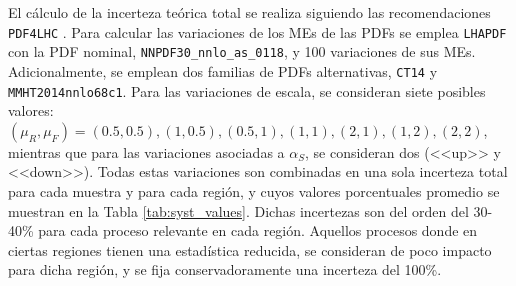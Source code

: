 \begin{sloppypar} %
El cálculo de la incerteza teórica total se realiza siguiendo las recomendaciones \texttt{PDF4LHC} \cite{Butterworth:2015oua}.
Para calcular las variaciones de los MEs de las PDFs se emplea \texttt{LHAPDF} \cite{lhapdf} con la PDF nominal, \texttt{NNPDF30\_nnlo\_as\_0118}, y 100 variaciones de sus MEs. Adicionalmente, se emplean dos familias de PDFs alternativas, \texttt{CT14} y \texttt{MMHT2014nnlo68c1}. Para las variaciones de escala, se consideran siete posibles valores: $(\mu_R, \mu_F) = (0.5,0.5), (1,0.5), (0.5,1), (1,1), (2,1), (1,2), (2,2)$, mientras que para las variaciones asociadas a $\alpha_S$, se consideran dos (<<up>> y <<down>>). Todas estas variaciones son combinadas en una sola incerteza total para cada muestra y para cada región, y cuyos valores porcentuales promedio se muestran en la Tabla \ref{tab:syst_values}. Dichas incertezas son del orden del 30-40\% para cada proceso relevante en cada región. Aquellos procesos donde en ciertas regiones tienen una estadística reducida, se consideran de poco impacto para dicha región, y se fija conservadoramente una incerteza del 100\%. 
\end{sloppypar} 

\begin{table}[ht!]
  \centering
  \caption{Promedio porcentual entre la variación superior e inferior de las incertezas teóricas de cada muestra de fondo en cada región. Los fondos con baja estadística no afectan los resultados en la región y sus incertezas se fijan conservadoramente a 100\%.
  }
\label{tab:syst_values}
\end{table}

